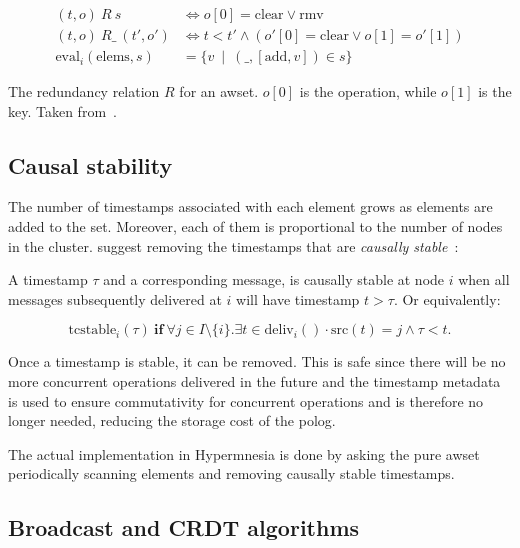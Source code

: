 \begin{listing}[htp]
  \centering
  \begin{align*}
    (t,o)\ R\ s &\iff o[0] = \mathrm{clear} \lor \mathrm{rmv}\\
    (t,o)\ R\_\ (t',o') &\iff t<t' \land (o'[0]=\mathrm{clear}\lor o[1]=o'[1]) \\
    \mathrm{eval}_i(\mathrm{elems},s) &= \{v\ \mid\ (\_,[\mathrm{add},v])\in s\}
  \end{align*} 
  \caption{The redundancy relation \(R\) for an \acrshort{awset}. \(o[0]\) is the
  operation, while \(o[1]\) is the key. Taken from~\cite{baquero2017PureOp}.} 
  \label{lst:aw set causal redundancy}
\end{listing}


\subsection{Causal stability}  \label{subsec:impl causal stability}

The number of timestamps associated with each element grows as elements are added
to the set. Moreover, each of them is proportional to the number of nodes in the 
cluster. \citet{baquero2014PureOp} suggest removing the timestamps that are
\emph{causally stable}~\cite{shapiro2011CRDT,baquero2017PureOp}:

\begin{definition}
  A timestamp \(\tau\) and a corresponding message, is causally stable at node 
  \(i\) when all messages subsequently delivered at \(i\) will have timestamp 
  \(t>\tau\).
  Or equivalently:

  \[
    \mathrm{tcstable}_i(\tau)\ \mathbf{if}\ \forall j\in I\setminus \{i\}. \exists
    t\in \mathrm{deliv}_i()\cdot\mathrm{src}(t) = j \land \tau < t.
  \]
\end{definition}

Once a timestamp is stable, it can be removed. This is safe since there will be no more
concurrent operations delivered in the future and the timestamp metadata is
used to ensure commutativity for concurrent operations and is therefore no longer
needed, reducing the storage cost of the \acrshort{polog}.

The actual implementation in Hypermnesia is done by asking the 
pure \acrshort{awset} periodically scanning elements and removing causally stable timestamps.

\subsection{Broadcast and CRDT algorithms} \label{subsec:impl pawset algorithm}

